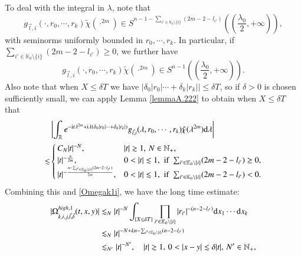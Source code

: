 \documentclass[11pt,reqno]{amsart}
\def\d{{\rm d}}
\numberwithin{equation}{section}
\theoremstyle{definition}
\begin{document}
To deal with the integral in $\lambda$, note that
\begin{equation*}
	g_{\vec{l},i}(\cdot,r_0,\cdots,r_k)\tilde{\chi}(\cdot^{2m})\in S^{n-1-\sum_{i'\in\mathbb{K}_0\setminus\{i\}}(2m-2-l_{i'})}\left((\mbox{$\frac{\lambda_0}{2}$},+\infty)\right),
\end{equation*}
with seminorms uniformly bounded in $r_0,\cdots,r_k$. In particular, if $\sum_{i'\in\mathbb{K}_0\setminus\{i\}}(2m-2-l_{i'})\geq0$, we further have
\begin{equation*}
	g_{\vec{l},i}(\cdot,r_0,\cdots,r_k)\tilde{\chi}(\cdot^{2m})\in S^{n-1}\left((\mbox{$\frac{\lambda_0}{2}$},+\infty)\right).
\end{equation*}
Also note that when $X\leq\delta T$ we have $\left|\delta_0|r_0|\cdots+\delta_k|r_k|\right|\leq\delta T$, so if $\delta>0$ is chosen sufficiently small, we can apply Lemma \ref{lemmaA.222} to obtain when $X\leq\delta T$ that
\begin{equation*}
	\begin{split}
			&\left|\int_{\mathbb{R}}e^{-\mathrm{i}t\lambda^{2m}+\mathrm{i}\lambda(\delta_0|r_0|\cdots+\delta_k|r_k|)}g_{\vec{l},i}(\lambda,r_0,\cdots,r_k)\tilde{\chi}(\lambda^{2m})\d\lambda\right|\\
			\lesssim&\begin{cases}
			C_N|t|^{-N},\quad&|t|\gtrsim1,\,N\in\mathbb{N}_+,\\
			|t|^{-\frac{n}{2m}},&0<|t|\lesssim1,\,\,\text{if}\,\,\sum_{i'\in\mathbb{K}_0\setminus\{i\}}(2m-2-l_{i'})\geq0,\\
			|t|^{-\frac{n-\sum_{i'\in\mathbb{K}_0\setminus\{i\}}(2m-2-l_{i'})}{2m}},&0<|t|\lesssim1,\,\,\text{if}\,\,\sum_{i'\in\mathbb{K}_0\setminus\{i\}}(2m-2-l_{i'})<0.
		\end{cases}
	\end{split}
\end{equation*}
Combining this and \eqref{Omegak1i}, we have the long time estimate:
\begin{equation}\label{Omegahigh1t>1}
	\begin{split}
		|\Omega_{k,i,j,\vec{l},\vec{\delta}}^{high,1}(t,x,y)|&\lesssim_N|t|^{-N}\int_{\{X\lesssim\delta T\}}\prod\limits_{i'\in\mathbb{K}_0\setminus\{i\}}|r_{i'}|^{-(n-2-l_{i'})}\d x_1\cdots \d x_k\\
		&\lesssim_N|t|^{-N+kn-\sum_{i'\in\mathbb{K}_0\setminus\{i\}}(n-2-l_{i'})}\\
		&\lesssim_{N'}|t|^{-N'},\quad|t|\gtrsim1,\,0<|x-y|\lesssim\delta|t|,\,N'\in\mathbb{N}_+,
	\end{split}
\end{equation}
\end{document}
